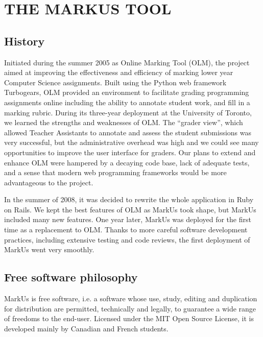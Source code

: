 \documentclass[twocolumn,10pt]{asme2e}
\begin{document}
\section*{THE MARKUS TOOL}



\subsection*{History}

Initiated during the summer 2005 as Online Marking Tool (OLM), the project aimed
at improving the effectiveness and efficiency of marking lower year Computer
Science assignments. Built using the Python web framework Turbogears, OLM
provided an environment to facilitate grading programming assignments online including the ability to annotate student work, and fill in a marking rubric. During its three-year deployment at the University of Toronto, we learned the strengths and weaknesses of OLM. The ``grader view'', which allowed Teacher Assistants to annotate and assess the student submissions was very successful, but the administrative overhead was high and we could see many opportunities to improve the user interface for graders. Our plans to extend and enhance OLM were hampered by a decaying code base, lack of adequate tests, and a sense that modern web programming frameworks would be more advantageous to the project.

In the summer of 2008, it was decided to rewrite the whole application in Ruby on Rails. We kept the best features of OLM as MarkUs took shape, but MarkUs included many new features. One year later, MarkUs was deployed for the first time as a replacement to OLM. Thanks to more careful software development practices, including extensive testing and code reviews, the first deployment of MarkUs went very smoothly.

\subsection*{Free software philosophy}
MarkUs is free software, i.e. a software whose use, study, editing and duplication for distribution are permitted, technically and legally, to guarantee a wide range of freedoms to the end-user. Licensed under the MIT Open Source License, it is developed mainly by Canadian and French students.
\end{document}
